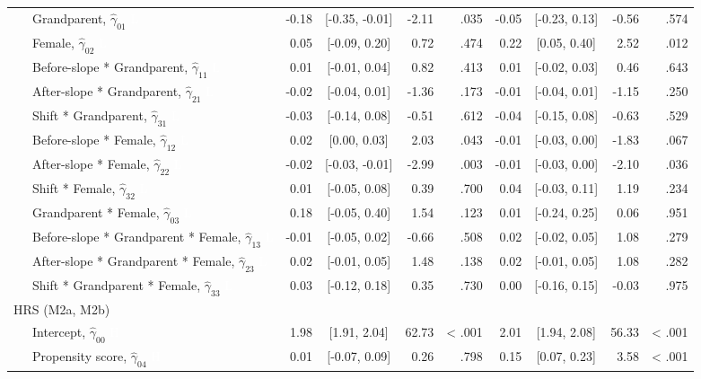 \documentclass[
  english,
  man, noextraspace]{apa7}
\newenvironment{lltable}{\begin{landscape}\begin{center}\begin{ThreePartTable}}{\end{ThreePartTable}\end{center}\end{landscape}}
\begin{document}
\begin{lltable}
{\begin{longtable}{lrcrrrcrr}
\ \ \ Grandparent, $\hat{\gamma}_{01}$ \textcolor{white}{L} & -0.18 & [-0.35, -0.01] & -2.11 & .035 & -0.05 & [-0.23, 0.13] & -0.56 & .574\\
\ \ \ Female, $\hat{\gamma}_{02}$ \textcolor{white}{L} & 0.05 & [-0.09, 0.20] & 0.72 & .474 & 0.22 & [0.05, 0.40] & 2.52 & .012\\
\ \ \ Before-slope * Grandparent, $\hat{\gamma}_{11}$ \textcolor{white}{L} & 0.01 & [-0.01, 0.04] & 0.82 & .413 & 0.01 & [-0.02, 0.03] & 0.46 & .643\\
\ \ \ After-slope * Grandparent, $\hat{\gamma}_{21}$ \textcolor{white}{L} & -0.02 & [-0.04, 0.01] & -1.36 & .173 & -0.01 & [-0.04, 0.01] & -1.15 & .250\\
\ \ \ Shift * Grandparent, $\hat{\gamma}_{31}$ \textcolor{white}{L} & -0.03 & [-0.14, 0.08] & -0.51 & .612 & -0.04 & [-0.15, 0.08] & -0.63 & .529\\
\ \ \ Before-slope * Female, $\hat{\gamma}_{12}$ \textcolor{white}{L} & 0.02 & [0.00, 0.03] & 2.03 & .043 & -0.01 & [-0.03, 0.00] & -1.83 & .067\\
\ \ \ After-slope * Female, $\hat{\gamma}_{22}$ \textcolor{white}{L} & -0.02 & [-0.03, -0.01] & -2.99 & .003 & -0.01 & [-0.03, 0.00] & -2.10 & .036\\
\ \ \ Shift * Female, $\hat{\gamma}_{32}$ \textcolor{white}{L} & 0.01 & [-0.05, 0.08] & 0.39 & .700 & 0.04 & [-0.03, 0.11] & 1.19 & .234\\
\ \ \ Grandparent * Female, $\hat{\gamma}_{03}$ \textcolor{white}{L} & 0.18 & [-0.05, 0.40] & 1.54 & .123 & 0.01 & [-0.24, 0.25] & 0.06 & .951\\
\ \ \ Before-slope * Grandparent * Female, $\hat{\gamma}_{13}$ \textcolor{white}{L} & -0.01 & [-0.05, 0.02] & -0.66 & .508 & 0.02 & [-0.02, 0.05] & 1.08 & .279\\
\ \ \ After-slope * Grandparent * Female, $\hat{\gamma}_{23}$ \textcolor{white}{L} & 0.02 & [-0.01, 0.05] & 1.48 & .138 & 0.02 & [-0.01, 0.05] & 1.08 & .282\\
\ \ \ Shift * Grandparent * Female, $\hat{\gamma}_{33}$ \textcolor{white}{L} & 0.03 & [-0.12, 0.18] & 0.35 & .730 & 0.00 & [-0.16, 0.15] & -0.03 & .975\\
HRS (M2a, M2b) &  &  &  &  &  &  &  & \\
\ \ \ Intercept, $\hat{\gamma}_{00}$ \textcolor{white}{H} & 1.98 & [1.91, 2.04] & 62.73 & < .001 & 2.01 & [1.94, 2.08] & 56.33 & < .001\\
\ \ \ Propensity score, $\hat{\gamma}_{04}$ \textcolor{white}{H} & 0.01 & [-0.07, 0.09] & 0.26 & .798 & 0.15 & [0.07, 0.23] & 3.58 & < .001\\

\end{longtable}}
\end{lltable}
\end{document}
